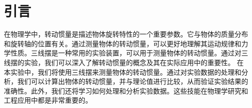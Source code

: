 \section{引言}
    在物理学中，转动惯量是描述物体旋转特性的一个重要参数。它与物体的质量分布和旋转轴的位置有关。通过测量物体的转动惯量，可以更好地理解其运动规律和力学性质。三线摆是一种常用的实验装置，可以用于测量物体的转动惯量。通过对三线摆的实验，我们可以深入了解转动惯量的概念及其在实际应用中的重要性。
    在本实验中，我们将使用三线摆来测量物体的转动惯量。通过对实验数据的处理和分析，我们可以计算出物体的转动惯量，并与理论值进行比较，从而验证实验结果的准确性。此外，我们还将学习如何处理和分析实验数据。这些技能在物理学研究和工程应用中都是非常重要的。
